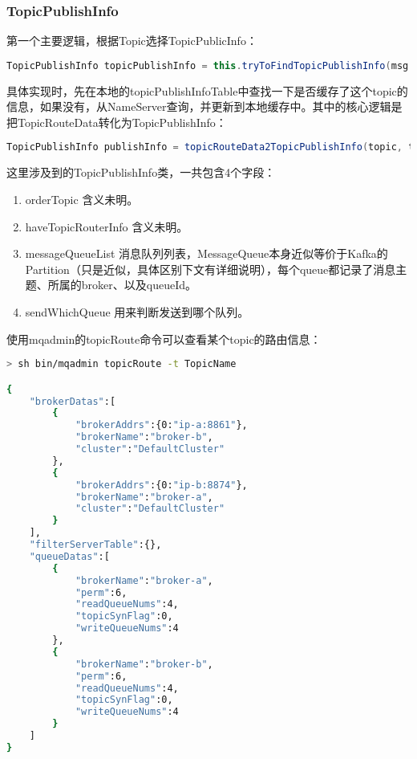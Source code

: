 \subsubsection{TopicPublishInfo}

第一个主要逻辑，根据Topic选择TopicPublicInfo：
\begin{lstlisting}[language=Java, style=customStyleJavaDark]
TopicPublishInfo topicPublishInfo = this.tryToFindTopicPublishInfo(msg.getTopic());
\end{lstlisting}

具体实现时，先在本地的topicPublishInfoTable中查找一下是否缓存了这个topic的信息，如果没有，从NameServer查询，并更新到本地缓存中。其中的核心逻辑是把TopicRouteData转化为TopicPublishInfo：
\begin{lstlisting}[language=Java, style=customStyleJavaDark]
TopicPublishInfo publishInfo = topicRouteData2TopicPublishInfo(topic, topicRouteData);
\end{lstlisting}

这里涉及到的TopicPublishInfo类，一共包含4个字段：
\begin{enumerate}[itemindent=1em]
\item orderTopic 含义未明。
\item haveTopicRouterInfo 含义未明。
\item messageQueueList 消息队列列表，MessageQueue本身近似等价于Kafka的Partition（只是近似，具体区别下文有详细说明），每个queue都记录了消息主题、所属的broker、以及queueId。
\item sendWhichQueue 用来判断发送到哪个队列。
\end{enumerate}

使用mqadmin的topicRoute命令可以查看某个topic的路由信息：
\begin{lstlisting}[language=sh, style=customStyleBashDark]
> sh bin/mqadmin topicRoute -t TopicName

{
    "brokerDatas":[
        {
            "brokerAddrs":{0:"ip-a:8861"},
            "brokerName":"broker-b",
            "cluster":"DefaultCluster"
        },
        {
            "brokerAddrs":{0:"ip-b:8874"},
            "brokerName":"broker-a",
            "cluster":"DefaultCluster"
        }
    ],
    "filterServerTable":{},
    "queueDatas":[
        {
            "brokerName":"broker-a",
            "perm":6,
            "readQueueNums":4,
            "topicSynFlag":0,
            "writeQueueNums":4
        },
        {
            "brokerName":"broker-b",
            "perm":6,
            "readQueueNums":4,
            "topicSynFlag":0,
            "writeQueueNums":4
        }
    ]
}
\end{lstlisting}


